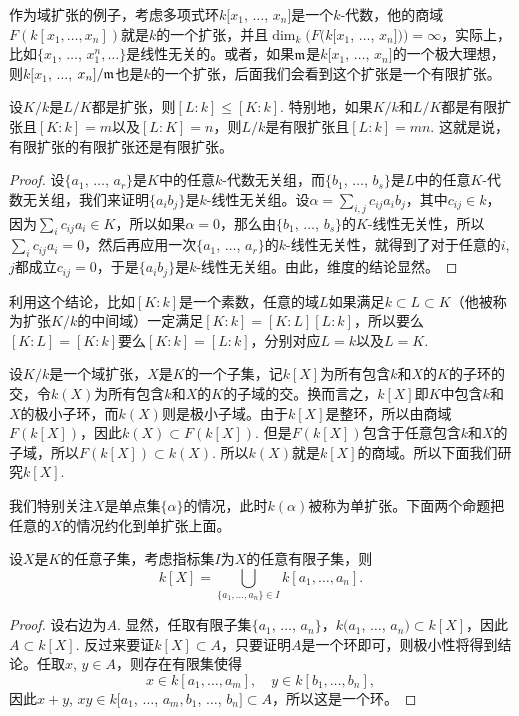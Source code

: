 作为域扩张的例子，考虑多项式环$k[x_1$, $\dots$, $x_n]$是一个$k$-代数，他的商域$F(k[x_1,\dots,x_n])$就是$k$的一个扩张，并且$\dim_k(F(k[x_1$, $\dots$, $x_n]))=\infty$，实际上，比如$\{x_1$, $\dots$, $x_1^n,\dots\}$是线性无关的。或者，如果$\mathfrak{m}$是$k[x_1$, $\dots$, $x_n]$的一个极大理想，则$k[x_1$, $\dots$, $x_n]/\mathfrak{m}$也是$k$的一个扩张，后面我们会看到这个扩张是一个有限扩张。

\begin{pro}
设$K/k$是$L/K$都是扩张，则$[L:k]\leq[K:k]$. 特别地，如果$K/k$和$L/K$都是有限扩张且$[K:k]=m$以及$[L:K]=n$，则$L/k$是有限扩张且$[L:k]=mn$. 这就是说，有限扩张的有限扩张还是有限扩张。
\end{pro}

\begin{proof} 
	设$\{a_1$, $\dots$, $a_r\}$是$K$中的任意$k$-代数无关组，而$\{b_1$, $\dots$, $b_s\}$是$L$中的任意$K$-代数无关组，我们来证明$\{a_ib_j\}$是$k$-线性无关组。设$\alpha=\sum_{i,j}c_{ij}a_ib_j$，其中$c_{ij}\in k$，因为$\sum_i c_{ij}a_i\in K$，所以如果$\alpha=0$，那么由$\{b_1$, $\dots$, $b_s\}$的$K$-线性无关性，所以$\sum_i c_{ij}a_i=0$，然后再应用一次$\{a_1$, $\dots$, $a_r\}$的$k$-线性无关性，就得到了对于任意的$i$, $j$都成立$c_{ij}=0$，于是$\{a_ib_j\}$是$k$-线性无关组。由此，维度的结论显然。
\end{proof}

利用这个结论，比如$[K:k]$是一个素数，任意的域$L$如果满足$k\subset L\subset K$（他被称为扩张$K/k$的中间域）一定满足$[K:k]=[K:L][L:k]$，所以要么$[K:L]=[K:k]$要么$[K:k]=[L:k]$，分别对应$L=k$以及$L=K$. 

\para 设$K/k$是一个域扩张，$X$是$K$的一个子集，记$k[X]$为所有包含$k$和$X$的$K$的子环的交，令$k(X)$为所有包含$k$和$X$的$K$的子域的交。换而言之，$k[X]$即$K$中包含$k$和$X$的极小子环，而$k(X)$则是极小子域。由于$k[X]$是整环，所以由商域$F(k[X])$，因此$k(X)\subset F(k[X])$. 但是$F(k[X])$包含于任意包含$k$和$X$的子域，所以$F(k[X])\subset k(X)$. 所以$k(X)$就是$k[X]$的商域。所以下面我们研究$k[X]$.

我们特别关注$X$是单点集$\{\alpha\}$的情况，此时$k(\alpha)$被称为单扩张。下面两个命题把任意的$X$的情况约化到单扩张上面。

\begin{pro}
设$X$是$K$的任意子集，考虑指标集$I$为$X$的任意有限子集，则
\[
	k[X]=\bigcup_{\{a_1,\dots,a_n\}\in I} k[a_1,\dots,a_n].
\]
\end{pro}

\begin{proof}
	设右边为$A$. 显然，任取有限子集$\{a_1$, $\dots$, $a_n\}$，$k(a_1$, $\dots$, $a_n)\subset k[X]$，因此$A\subset k[X]$. 反过来要证$k[X]\subset A$，只要证明$A$是一个环即可，则极小性将得到结论。任取$x$, $y\in A$，则存在有限集使得
	\[
		x\in k[a_1,\dots,a_m],\quad y\in k[b_1,\dots,b_n],
	\]
	因此$x+y$, $xy\in k[a_1$, $\dots$, $a_m,b_1$, $\dots$, $b_n]\subset A$，所以这是一个环。
\end{proof}

